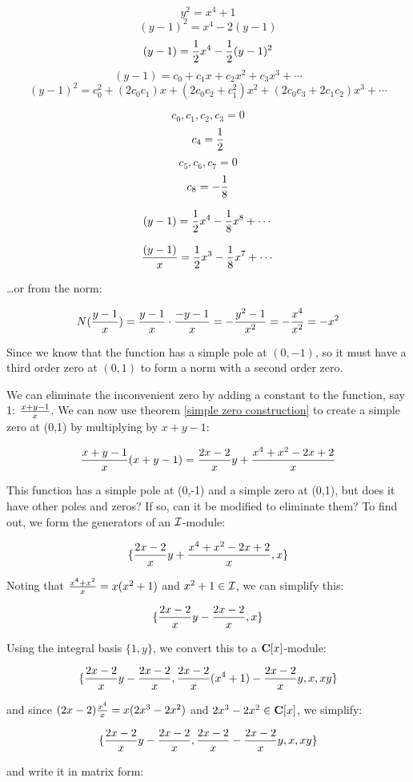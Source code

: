 $$y^2 = x^4 + 1 $$
$$(y-1)^2 = x^4 - 2(y-1)$$
$$(y-1) = {1\over2}x^4 - {1\over2}(y-1)^2$$
$$(y-1) = c_0 + c_1 x + c_2 x^2 + c_3 x^3 + \cdots$$
$$(y-1)^2 = c_0^2 + (2 c_0 c_1) x + (2 c_0 c_2 + c_1^2) x^2 + (2 c_0 c_3 + 2 c_1 c_2) x^3 + \cdots$$

$$ c_0, c_1, c_2, c_3 = 0 $$
$$ c_4 = {1\over2}$$
$$ c_5, c_6, c_7 = 0 $$
$$ c_8 = -{1\over8} $$

$$ (y-1) = {1\over2} x^4 - {1\over8} x^8 + \cdots$$

$$ {(y-1)\over x} = {1\over2} x^3 - {1\over8} x^7 + \cdots$$

\ldots or from the norm:

$$N({{y-1}\over{x}}) = {{y-1}\over{x}} \cdot {{-y-1}\over{x}} = - {{y^2-1}\over{x^2}} = - {{x^4}\over{x^2}} = - x^2$$

Since we know that the function has a simple pole at $(0,-1)$, so it
must have a third order zero at $(0,1)$ to form a norm with a second
order zero.

We can eliminate the inconvenient zero by adding a constant to the
function, say 1: ${{x+y-1}\over x}$.  We can now use theorem
\ref{simple zero construction} to create a simple zero at
(0,1) by multiplying by $x+y-1$:

$${{x+y-1}\over x} (x+y-1) = {{2x-2}\over x} y + {{x^4+x^2-2x+2}\over x} $$

This function has a simple pole at (0,-1) and a simple zero at (0,1),
but does it have other poles and zeros?  If so, can it be modified to
eliminate them?  To find out, we form the generators of an ${\cal I}$-module:

$$\{ {{2x-2}\over x} y + {{x^4+x^2-2x+2}\over x}, x \}$$

Noting that ${{x^4+x^2}\over{x}} = x(x^2+1)$ and $x^2+1 \in {\cal I}$,
we can simplify this:

$$\{ {{2x-2}\over x} y - {{2x-2}\over x}, x \}$$

\vfill\eject

Using the integral basis $\{1, y \}$, we convert this to a
${\bf C}[x]$-module:

$$\{ {{2x-2}\over x} y - {{2x-2}\over x}, {{2x-2}\over x} (x^4+1) - {{2x-2}\over x} y, x, xy \}$$

and since $(2x-2){{x^4}\over{x}} = x(2x^3-2x^2)$ and
$2x^3-2x^2 \in {\bf C}[x]$, we simplify:

$$\{ {{2x-2}\over x} y - {{2x-2}\over x}, {{2x-2}\over x} - {{2x-2}\over x} y, x, xy \}$$

and write it in matrix form:

